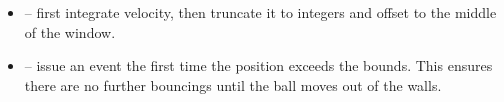 \documentclass{beamer}
\begin{document}
\begin{itemize}
\begin{itemize}
    \item {}{\hlopt{(}}{}{\hlopt{) +* }}{}{\hlopt{/* !*}}{} -- first integrate velocity, then truncate it
    to integers and offset to the middle of the window.
    
    \item {}{\hlopt{((}}{}{\hlopt{>*
    }}{}{\hlopt{-* !*}}{}{\hlopt{)
    }}{\hlstd{{\hlopt{\textbar\textbar}}}}{\hlopt{* (}}{}{\hlopt{<* !*}}{}{\hlopt{))}} -- issue an event the first time
    the position exceeds the bounds. This ensures there are no further
    bouncings until the ball moves out of the walls.
  \end{itemize}
\end{itemize}
\end{document}
